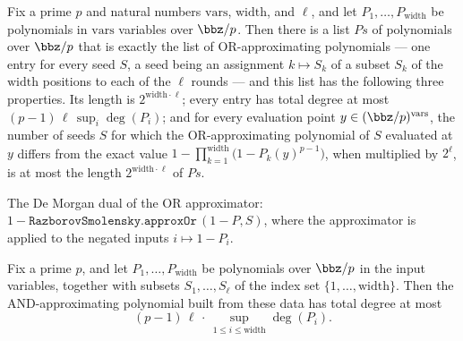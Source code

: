 \begin{theorem}
\label{RazborovSmolensky.exists_good_approxOr}
\leanok
{}
Fix a prime $p$ and natural numbers $\mathrm{vars}$, $\mathrm{width}$, and $\ell$, and
let $P_1,\dots,P_{\mathrm{width}}$ be polynomials in $\mathrm{vars}$ variables over
$\bbz/p$. Then there is a list $Ps$ of polynomials over $\bbz/p$ that is exactly the
list of OR-approximating polynomials — one entry for every seed $S$, a seed being an
assignment $k \mapsto S_k$ of a subset $S_k$ of the $\mathrm{width}$ positions to each
of the $\ell$ rounds — and this list has the following three properties. Its length is
$2^{\mathrm{width}\cdot\ell}$; every entry has total degree at most $(p-1)\,\ell\,\sup_i
\deg(P_i)$; and for every evaluation point $y \in (\bbz/p)^{\mathrm{vars}}$, the number
of seeds $S$ for which the OR-approximating polynomial of $S$ evaluated at $y$ differs
from the exact value $1 - \prod_{k=1}^{\mathrm{width}}\bigl(1 - P_k(y)^{p-1}\bigr)$,
when multiplied by $2^{\ell}$, is at most the length $2^{\mathrm{width}\cdot\ell}$ of
$Ps$.
\end{theorem}

\begin{definition}
\label{RazborovSmolensky.approxAnd}
\leanok
{}
The De Morgan dual of the OR approximator: $1 - \texttt{RazborovSmolensky.approxOr}\,(1 - P, S)$, where the
approximator is applied to the negated inputs $i \mapsto 1 - P_i$.
\end{definition}

\begin{theorem}
\label{RazborovSmolensky.approxAnd_totalDegree}
\leanok
{}
Fix a prime $p$, and let $P_1,\dots,P_{\mathrm{width}}$ be polynomials over $\bbz/p$ in
the input variables, together with subsets $S_1,\dots,S_\ell$ of the index set
$\{1,\dots,\mathrm{width}\}$. Then the AND-approximating polynomial built from these
data has total degree at most
\[
(p-1)\,\ell\,\cdot\,\sup_{1 \le i \le \mathrm{width}} \deg(P_i).
\]
\end{theorem}

